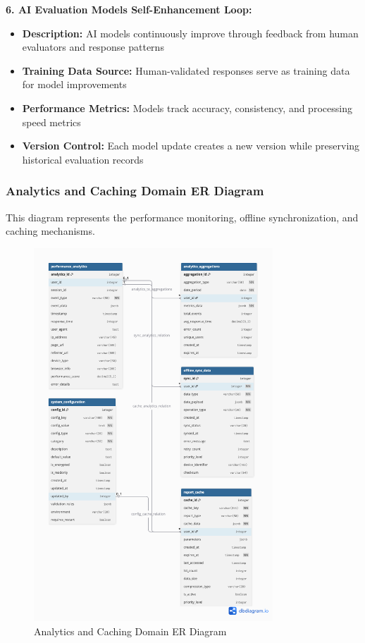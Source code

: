 \documentclass[12pt,a4paper,oneside]{book}
\begin{document}
\textbf{6. AI Evaluation Models Self-Enhancement Loop:}
\begin{itemize}
    \item \textbf{Description:} AI models continuously improve through feedback from human evaluators and response patterns
    \item \textbf{Training Data Source:} Human-validated responses serve as training data for model improvements
    \item \textbf{Performance Metrics:} Models track accuracy, consistency, and processing speed metrics
    \item \textbf{Version Control:} Each model update creates a new version while preserving historical evaluation records
\end{itemize}

\subsubsection{Analytics and Caching Domain ER Diagram}

This diagram represents the performance monitoring, offline synchronization, and caching mechanisms.

\begin{figure}[H]
    \centering
    \includegraphics[width=0.8\textwidth]{assets/ER/Figure4.10.png}
    \caption{Analytics and Caching Domain ER Diagram}
    \label{fig:analytics_er}
\end{figure}
\end{document}
